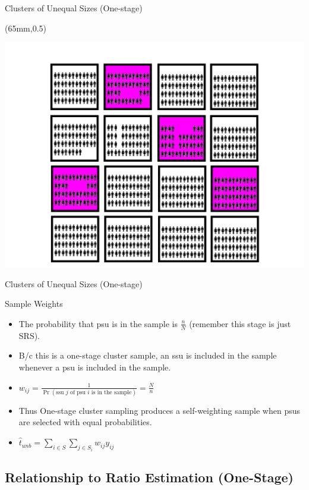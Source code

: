 \documentclass[10pt]{beamer}\usepackage[]{graphicx}\usepackage[]{xcolor}
\begin{document}
\begin{frame}{Clusters of Unequal Sizes (One-stage)}
\begin{textblock*}{50mm}(65mm,0.5\textheight)
\begin{block}{}
\includegraphics[width=1\linewidth]{figures/cluster.png}
\end{block}
\end{textblock*}

\end{frame}

\begin{frame}{Clusters of Unequal Sizes (One-stage)}
\begin{block}{Sample Weights}
\begin{itemize}
\item The probability that psu is in the sample is $\frac{n}{N}$ (remember this stage is just SRS).
\item B/c this is a one-stage cluster sample, an ssu is included in the sample whenever a psu is included in the sample.
\item $w_{ij} = \frac{1}{\Pr(\textrm{ssu $j$ of psu $i$ is in the sample})} = \frac{N}{n}$
\item Thus One-stage cluster sampling produces a self-weighting sample when psus are selected with equal probabilities.
\item $\hat{t}_{unb} = \sum_{i \in S} \sum_{j \in S_i} w_{ij} y_{ij}$
\end{itemize}
\end{block}
\end{frame}


\subsection{Relationship to Ratio Estimation (One-Stage)}
\end{document}
